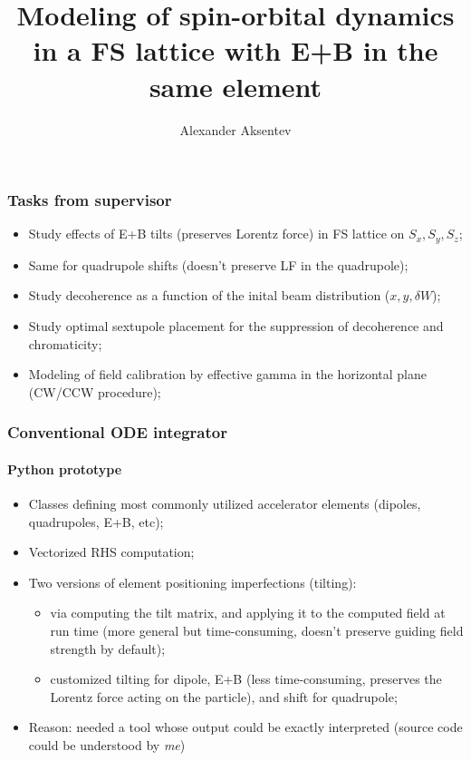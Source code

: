 \documentclass[pdf]{beamer}
\title{Modeling of spin-orbital dynamics in a FS lattice with E+B in the same element}
\author{Alexander Aksentev}
\begin{document}
	\begin{frame}
		\titlepage
	\end{frame}	

	\begin{frame}
		\frametitle{Tasks from supervisor}
		\begin{itemize}
			\item Study effects of E+B tilts (preserves Lorentz force) in FS lattice on $S_x, S_y, S_z$;
			\item Same for quadrupole shifts (doesn't preserve LF in the quadrupole);
			\item Study decoherence as a function of the inital beam distribution ($x, y, \delta W$);
			\item Study optimal sextupole placement for the suppression of decoherence and chromaticity;
			\item Modeling of field calibration by effective gamma in the horizontal plane (CW/CCW procedure);
		\end{itemize}
	\end{frame}

	\begin{frame}
		\frametitle{Conventional ODE integrator}
		\framesubtitle{Python prototype}
		\begin{itemize}
			\item Classes defining most commonly utilized accelerator elements (dipoles, quadrupoles, E+B, etc);
			\item Vectorized RHS computation;
			\item Two versions of element positioning imperfections (tilting):
			\begin{itemize}
				\item via computing the tilt matrix, and applying it to the computed field at run time (more general but time-consuming, doesn't preserve guiding field strength by default);
				\item customized tilting for dipole, E+B (less time-consuming, preserves the Lorentz force acting on the particle), and shift for quadrupole;
			\end{itemize}
		\item Reason: needed a tool whose output could be exactly interpreted (source code could be understood by \emph{me})
		\end{itemize}
	\end{frame}
\end{document}
